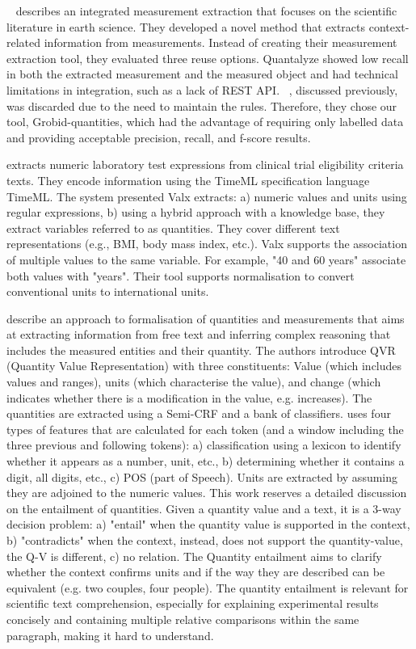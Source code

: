 ~\cite{hundman2017measurement} describes an integrated measurement extraction that focuses on the scientific literature in earth science. 
They developed a novel method that extracts context-related information from measurements. Instead of creating their measurement extraction tool, they evaluated three reuse options. Quantalyze showed low recall in both the extracted measurement and the measured object and had technical limitations in integration, such as a lack of REST API. ~\cite{agatonovic2008large}, discussed previously, was discarded due to the need to maintain the rules. 
Therefore, they chose our tool, Grobid-quantities, which had the advantage of requiring only labelled data and providing acceptable precision, recall, and f-score results. 

\cite{hao2016} extracts numeric laboratory test expressions from clinical trial eligibility criteria texts. 
They encode information using the TimeML specification language TimeML. The system presented Valx extracts: a) numeric values and units using regular expressions, b) using a hybrid approach with a knowledge base, they extract variables referred to as quantities. They cover different text representations (e.g., BMI, body mass index, etc.). Valx supports the association of multiple values to the same variable. For example, "40 and 60 years" associate both values with "years". Their tool supports normalisation to convert conventional units to international units. 

\cite{roy2015reasoning} describe an approach to formalisation of quantities and measurements that aims at extracting information from free text and inferring complex reasoning that includes the measured entities and their quantity. 
The authors introduce QVR (Quantity Value Representation) with three constituents: Value (which includes values and ranges), units (which characterise the value), and change (which indicates whether there is a modification in the value, e.g. increases). 
The quantities are extracted using a Semi-CRF and a bank of classifiers. 
\cite{roy2015reasoning} uses four types of features that are calculated for each token (and a window including the three previous and following tokens): a) classification using a lexicon to identify whether it appears as a number, unit, etc., b) determining whether it contains a digit, all digits, etc., c) POS (part of Speech). Units are extracted by assuming they are adjoined to the numeric values. 
This work reserves a detailed discussion on the entailment of quantities. Given a quantity value and a text, it is a 3-way decision problem: a) "entail" when the quantity value is supported in the context, b) "contradicts" when the context, instead, does not support the quantity-value, the Q-V is different, c) no relation. 
The Quantity entailment aims to clarify whether the context confirms units and if the way they are described can be equivalent (e.g. two couples, four people). The quantity entailment is relevant for scientific text comprehension, especially for explaining experimental results concisely and containing multiple relative comparisons within the same paragraph, making it hard to understand. 

